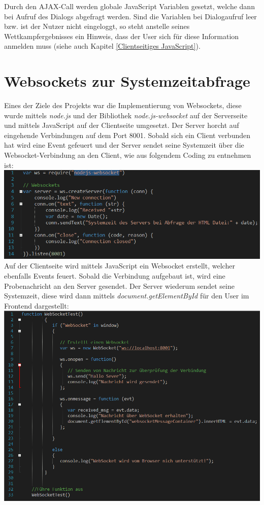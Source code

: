 Durch den AJAX-Call werden globale JavaScript Variablen gesetzt, welche dann bei Aufruf des Dialogs abgefragt werden. Sind die Variablen bei Dialogaufruf leer bzw. ist der Nutzer nicht eingeloggt, so steht anstelle seines Wettkampfergebnisses ein Hinweis, dass der User sich für diese Information anmelden muss (siehe auch Kapitel \vref{Clientseitiges JavaScript}).

\pagebreak
\section{Websockets zur Systemzeitabfrage}
Eines der Ziele des Projekts war die Implementierung von Websockets, diese wurde mittels \textit{node.js} und der Bibliothek \textit{node.js-websocket}
auf der Serverseite und mittels JavaScript auf der Clientseite umgesetzt. Der Server horcht auf eingehende Verbindungen auf dem Port 8001. Sobald sich ein Client verbunden hat wird eine Event gefeuert und der Server sendet seine Systemzeit \"uber die Websocket-Verbindung an den Client, wie aus folgendem Coding zu entnehmen ist:  
\newline
\includegraphics[width=1\textwidth]{img/vincent/abb02.png}
\newline
Auf der Clientseite wird mittels JavaScript ein Websocket erstellt, welcher ebenfalls Events feuert. Sobald die Verbindung aufgebaut ist, wird eine Probenachricht an den Server gesendet. Der Server wiederum sendet seine Systemzeit, diese wird dann mittels \textit{document.getElementById} f\"ur den User im Frontend dargestellt: 
\newline
\includegraphics[width=1\textwidth]{img/vincent/abb03.png}
